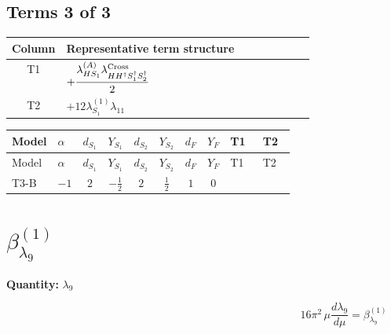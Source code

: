 \documentclass[8pt]{article}
\begin{document}
\begin{landscape}
\subsection*{Terms 3 of 3}
\begin{center}
\begin{tabular}{@{}c >{\raggedright\arraybackslash}p{0.82\linewidth}@{}}
\toprule
Column & Representative term structure \\
\midrule
T1 & \(\displaystyle +\frac{{\lambda_{HS_1}^{(A)}} {\lambda_{H H^\dagger S_1^\dagger S_2^\dagger}^{\rm Cross}}}{2}\) \\
\midrule
T2 & \(\displaystyle +12 {\lambda_{S_1}^{(1)}} {\lambda_{11}}\) \\
\midrule
\bottomrule
\end{tabular}
\end{center}
\smallskip
\tiny
\begin{longtable}{@{}llcccccc >{\raggedright\arraybackslash}p{0.21\linewidth} >{\raggedright\arraybackslash}p{0.21\linewidth}@{}}
\toprule
Model & $\alpha$ & $d_{S_1}$ & $Y_{S_1}$ & $d_{S_2}$ & $Y_{S_2}$ & $d_F$ & $Y_F$ & T1 & T2 \\
\midrule
\endfirsthead
\toprule
Model & $\alpha$ & $d_{S_1}$ & $Y_{S_1}$ & $d_{S_2}$ & $Y_{S_2}$ & $d_F$ & $Y_F$ & T1 & T2 \\
\midrule
\endhead
T3-B & $-1$ & $2$ & $-\frac{1}{2}$ & $2$ & $\frac{1}{2}$ & $1$ & $0$ & \scriptsize\adjustbox{max width=\linewidth}{$\begin{gathered} +\frac{{\lambda_{HS_1}^{(A)}} {\lambda_{H H^\dagger S_1^\dagger S_2^\dagger}^{\rm Cross}}}{2}\end{gathered}$} & \scriptsize\adjustbox{max width=\linewidth}{$\begin{gathered} +12 {\lambda_{S_1}^{(1)}} {\lambda_{11}}\end{gathered}$} \\
\midrule
\bottomrule
\end{longtable}
\clearpage
\section*{$\beta_{\lambda_{9}}^{(1)}$}
\noindent\textbf{Quantity: }$\lambda_{9}$\par\smallskip
\[16\pi^2\,\mu\frac{d \lambda_{9}}{d\mu}=\beta_{\lambda_{9}}^{(1)}\]

\end{landscape}
\end{document}
